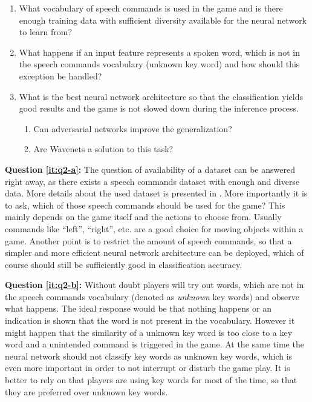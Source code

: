 \begin{enumerate}[label={Q.2.\alph*)}, leftmargin=1.75cm]
  \item What vocabulary of speech commands is used in the game and is there enough training data with sufficient diversity available for the neural network to learn from?\label{it:q2-a}
  \item What happens if an input feature represents a spoken word, which is not in the speech commands vocabulary (unknown key word) and how should this exception be handled?\label{it:q2-b}
  \item What is the best neural network architecture so that the classification yields good results and the game is not slowed down during the inference process.\label{it:q2-c}
  \begin{enumerate}[label=(\roman*)]
    \item Can adversarial networks improve the generalization?
    \item Are Wavenets a solution to this task? 
  \end{enumerate}
\end{enumerate}
\noindent
\textbf{Question \ref{it:q2-a}:} The question of availability of a dataset can be answered right away, as there exists a speech commands dataset \cite{Warden2018} with enough and diverse data.
More details about the used dataset is presented in .
More importantly it is to ask, which of those speech commands should be used for the game?
This mainly depends on the game itself and the actions to choose from.
Usually commands like \enquote{left}, \enquote{right}, etc. are a good choice for moving objects within a game.
Another point is to restrict the amount of speech commands, so that a simpler and more efficient neural network architecture can be deployed, which of course should still be sufficiently good in classification accuracy.

\textbf{Question \ref{it:q2-b}:} Without doubt players will try out words, which are not in the speech commands vocabulary (denoted as \emph{unknown} key words) and observe what happens.
The ideal response would be that nothing happens or an indication is shown that the word is not present in the vocabulary. 
However it might happen that the similarity of a unknown key word is too close to a key word and a unintended command is triggered in the game. 
At the same time the neural network should not classify key words as unknown key words, which is even more important in order to not interrupt or disturb the game play.
It is better to rely on that players are using key words for most of the time, so that they are preferred over unknown key words.

